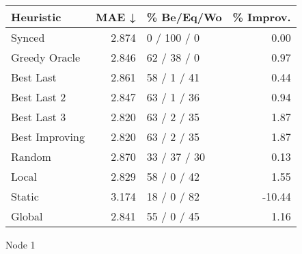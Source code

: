 \begin{tabular}{lrlr}
\toprule
\textbf{Heuristic} & \textbf{MAE ↓} & \textbf{\% Be/Eq/Wo} & \textbf{\% Improv.} \\
\midrule
            Synced &          2.874 &          0 / 100 / 0 &                0.00 \\
     Greedy Oracle &          2.846 &          62 / 38 / 0 &                0.97 \\
         Best Last &          2.861 &          58 / 1 / 41 &                0.44 \\
       Best Last 2 &          2.847 &          63 / 1 / 36 &                0.94 \\
       Best Last 3 &          2.820 &          63 / 2 / 35 &                1.87 \\
    Best Improving &          2.820 &          63 / 2 / 35 &                1.87 \\
            Random &          2.870 &         33 / 37 / 30 &                0.13 \\
             Local &          2.829 &          58 / 0 / 42 &                1.55 \\
            Static &          3.174 &          18 / 0 / 82 &              -10.44 \\
            Global &          2.841 &          55 / 0 / 45 &                1.16 \\
\bottomrule
\end{tabular}
\caption{Node 1}
\label{tab:ds_non_lr01_le1_bs4_1}
